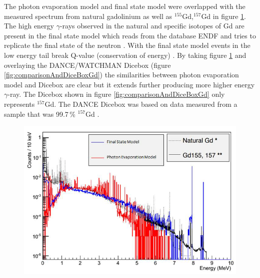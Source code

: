 The photon evaporation model and final state model were overlapped with the measured spectrum from natural gadolinium as well as $^{155}$Gd,$^{157}$Gd in figure \ref{fig:comparisonGd}. The high energy $\gamma$-rays observed in the natural and specific isotopes of Gd are present in the final state model which reads from the database ENDF \cite{BROWN20181} and tries to replicate the final state of the neutron \cite{koiTatsumi_2006}. With the final state model events in the low energy tail break Q-value (conservation of energy) \cite{YuChen_2015}. By taking figure \ref{fig:comparisonGd} and overlaying the DANCE/WATCHMAN Dicebox (figure \ref{fig:comparisonAndDiceBoxGd}) the similarities between photon evaporation model and Dicebox are clear but it extends further producing more higher energy $\gamma$-ray. The Dicebox shown in figure \ref{fig:comparisonAndDiceBoxGd} only represents $^{157}$Gd. The DANCE Dicebox was based on data measured from a sample that was  99.7\,\% $^{157}$Gd \cite{Chyzh_2011}. 

\begin{figure}[!h]
 \centering
 \includegraphics[width=0.6\linewidth]{Chapter4/Figs/Raster/gadolinium/comparisonGd.png}
 \label{fig:comparisonGd}
\end{figure}

